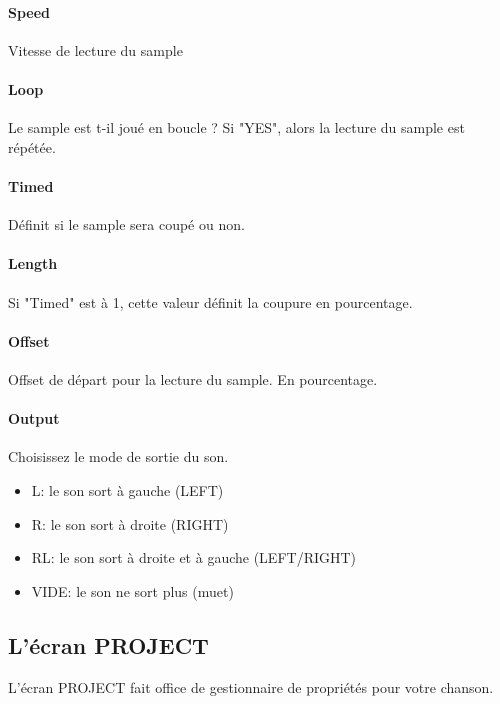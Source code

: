 \documentclass[12pt,a4paper]{article}
\begin{document}
        \paragraph{Speed} Vitesse de lecture du sample

        \paragraph{Loop} Le sample est t-il joué en boucle ? Si "YES", alors la lecture du sample est répétée.

        \paragraph{Timed} Définit si le sample sera coupé ou non.

        \paragraph{Length} Si "Timed" est à 1, cette valeur définit la coupure en pourcentage.

        \paragraph{Offset} Offset de départ pour la lecture du sample. En pourcentage.

        \paragraph{Output} Choisissez le mode de sortie du son.
        \begin{itemize}
            \item{L: le son sort à gauche (LEFT)}
            \item{R: le son sort à droite (RIGHT)}
            \item{RL: le son sort à droite et à gauche (LEFT/RIGHT)}
            \item{VIDE: le son ne sort plus (muet)}
        \end{itemize}

    \subsection{L'écran PROJECT}

    L'écran PROJECT fait office de gestionnaire de propriétés pour votre chanson.

\end{document}
